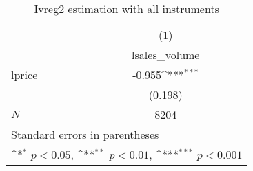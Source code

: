 \begin{table}[htbp]\centering
\def\sym#1{\ifmmode^{#1}\else\(^{#1}\)\fi}
\caption{Ivreg2 estimation with all instruments}
\begin{tabular}{l*{1}{c}}
\hline\hline
            &\multicolumn{1}{c}{(1)}\\
            &\multicolumn{1}{c}{lsales\_volume}\\
\hline
lprice      &      -0.955\sym{***}\\
            &     (0.198)         \\
\hline
\(N\)       &        8204         \\
\hline\hline
\multicolumn{2}{l}{\footnotesize Standard errors in parentheses}\\
\multicolumn{2}{l}{\footnotesize \sym{*} \(p<0.05\), \sym{**} \(p<0.01\), \sym{***} \(p<0.001\)}\\
\end{tabular}
\end{table}
